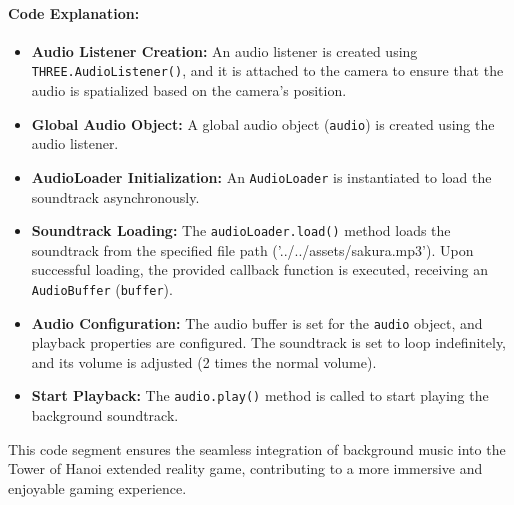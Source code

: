\documentclass{article}
\begin{document}
\paragraph{Code Explanation:}

\begin{itemize}
    \item \textbf{Audio Listener Creation:} An audio listener is created using \texttt{THREE.AudioListener()}, and it is attached to the camera to ensure that the audio is spatialized based on the camera's position.

    \item \textbf{Global Audio Object:} A global audio object (\texttt{audio}) is created using the audio listener.

    \item \textbf{AudioLoader Initialization:} An \texttt{AudioLoader} is instantiated to load the soundtrack asynchronously.

    \item \textbf{Soundtrack Loading:} The \texttt{audioLoader.load()} method loads the soundtrack from the specified file path ('../../assets/sakura.mp3'). Upon successful loading, the provided callback function is executed, receiving an \texttt{AudioBuffer} (\texttt{buffer}).

    \item \textbf{Audio Configuration:} The audio buffer is set for the \texttt{audio} object, and playback properties are configured. The soundtrack is set to loop indefinitely, and its volume is adjusted (2 times the normal volume).

    \item \textbf{Start Playback:} The \texttt{audio.play()} method is called to start playing the background soundtrack.

\end{itemize}

This code segment ensures the seamless integration of background music into the Tower of Hanoi extended reality game, contributing to a more immersive and enjoyable gaming experience.
\end{document}

